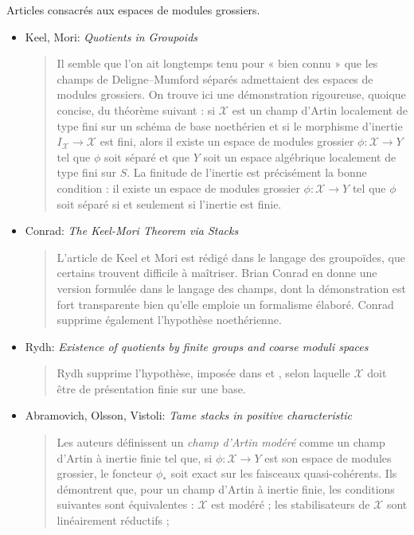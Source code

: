 \noindent
Articles consacrés aux espaces de modules grossiers.
\begin{itemize}
\item Keel, Mori: \emph{Quotients in Groupoids} \cite{K-M}
\begin{quote}
Il semble que l'on ait longtemps tenu pour « bien connu » que les champs de
Deligne--Mumford séparés admettaient des espaces de modules grossiers. On trouve
ici une démonstration rigoureuse, quoique concise, du théorème suivant : si
$\mathcal{X}$ est un champ d'Artin localement de
type fini sur un schéma de base noethérien et si le morphisme d'inertie
$I_\mathcal{X} \to \mathcal{X}$ est fini, alors il existe un espace de
modules grossier $\phi : \mathcal{X} \to Y$
tel que $\phi$ soit séparé et que $Y$ soit un espace algébrique localement de
type fini sur $S$. La finitude de l'inertie est précisément la bonne
condition : il existe un espace de modules grossier
$\phi : \mathcal{X} \to Y$ tel que $\phi$
soit séparé si et seulement si l'inertie est finie.
\end{quote}
\item Conrad: \emph{The Keel-Mori Theorem via Stacks} \cite{conrad}
\begin{quote}
L'article de Keel et Mori \cite{K-M} est rédigé dans le langage des groupoïdes,
que certains trouvent difficile à maîtriser. Brian Conrad en donne une version
formulée dans le langage des champs, dont la démonstration est fort transparente
bien qu'elle emploie un formalisme élaboré. Conrad supprime également
l'hypothèse noethérienne.
\end{quote}
\item Rydh: \emph{Existence of quotients by finite groups and coarse moduli
spaces} \cite{rydh_quotients}
\begin{quote}
Rydh supprime l'hypothèse, imposée dans \cite{K-M} et \cite{conrad}, selon
laquelle $\mathcal{X}$
doit être de présentation finie sur une base.
\end{quote}
\item
Abramovich, Olsson, Vistoli: \emph{Tame stacks in positive characteristic}
\cite{tame}
\begin{quote}
Les auteurs définissent un \emph{champ d'Artin modéré} comme un champ d'Artin à
inertie finie tel que, si $\phi : \mathcal{X} \to Y$ est son espace de modules
grossier, le foncteur $\phi_*$ soit exact
sur les faisceaux quasi-cohérents. Ils démontrent que, pour un champ d'Artin à
inertie finie, les conditions suivantes sont équivalentes : $\mathcal{X}$ est
modéré ; les stabilisateurs de $\mathcal{X}$ sont linéairement réductifs ;

\end{quote}
\end{itemize}
